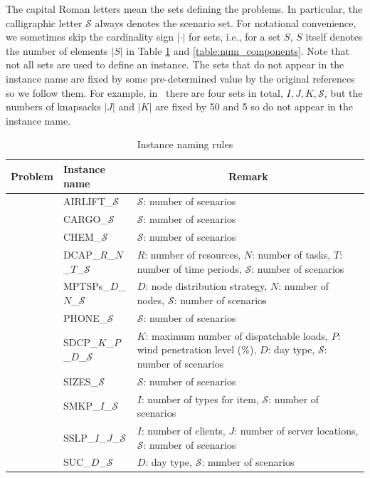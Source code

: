 The capital Roman letters mean the sets defining the problems. In particular, the calligraphic letter $\mathcal{S}$ always denotes the scenario set. For notational convenience, we sometimes skip the cardinality sign $|\cdot|$ for sets, i.e., for a set $S$, $S$ itself denotes the number of elements $|S|$ in Table \ref{table:naming_rule} and \ref{table:num_components}. Note that not all sets are used to define an instance. The sets that do not appear in the instance name are fixed by some pre-determined value by the original references so we follow them. For example, in \smkp\ there are four sets in total, $I,J,K,\mathcal{S}$, but the numbers of knapsacks $|J|$ and $|K|$ are fixed by 50 and 5 so do not appear in the instance name.
\begin{table}[H]
	\centering
	\caption{Instance naming rules}
	\label{table:naming_rule}
	\resizebox{\textwidth}{!}
	{%
		\begin{tabular}{@{}llp{3in}}
			\toprule
			Problem & Instance name                 & \multicolumn{1}{c}{Remark}                                                                    					      \\ \midrule
			\airlift	& AIRLIFT\_$\mathcal{S}$& $\mathcal{S}$: number of scenarios\\
			\cargo	& CARGO\_$\mathcal{S}$& $\mathcal{S}$: number of scenarios\\		
			\chem	& CHEM\_$\mathcal{S}$& $\mathcal{S}$: number of scenarios\\				
			\dcap\    & DCAP\_$R$\_$N$\_$T$\_$\mathcal{S}$    &   $R$: number of resources, $N$: number of tasks, $T$: number of time periods, $\mathcal{S}$: number of scenarios        \\
			\mptsps\  & MPTSPs\_$D$\_$N$\_$\mathcal{S}$ &$D$: node distribution strategy, $N$: number of nodes, $\mathcal{S}$: number of scenarios\\
			\phone	& PHONE\_$\mathcal{S}$& $\mathcal{S}$: number of scenarios\\
			\sdcp\ & SDCP\_$K$\_$P$\_$D$\_$\mathcal{S}$ & $K$: maximum number of dispatchable loads, $P$: wind penetration level (\%), $D$: day type, $\mathcal{S}$: number of scenarios\\
			\sizes\   & SIZES\_$\mathcal{S}$                            & $\mathcal{S}$: number of scenarios   															\\
			\smkp\    &   SMKP\_$I$\_$\mathcal{S}$    &   $I$: number of types for item, $\mathcal{S}$: number of scenarios  													 \\
			\sslp\    &  SSLP\_$I$\_$J$\_$\mathcal{S}$      &    $I$: number of clients, $J$: number of server locations, $\mathcal{S}$: number of scenarios                 				   \\
			\suc\    & 	SUC\_$D$\_$\mathcal{S}$    &  $D$: day type, $\mathcal{S}$: number of scenarios                                                 						 \\ \bottomrule
		\end{tabular}%
	}
\end{table}

